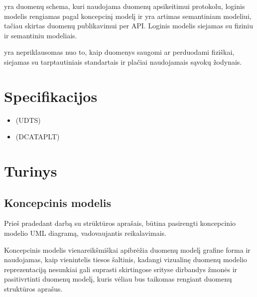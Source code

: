 \documentclass[letterpaper,10pt,lithuanian]{sphinxmanual}
\begin{document}
\sphinxAtStartPar
{} yra duomenų schema, kuri naudojama duomenų apsikeitimui
 protokolu, loginis modelis rengiamas pagal koncepcinį modelį ir yra
artimas semantiniam modeliui, tačiau skirtas duomenų publikavimui per API.
Loginis modelis siejamas su fiziniu ir semantiniu modeliais.

\sphinxAtStartPar
{} yra nepriklausomas nuo to, kaip duomenys saugomi ar
perduodami fiziškai, siejamas su tarptautiniais standartais ir plačiai
naudojamais sąvokų žodynais.


\chapter{Specifikacijos}
\label{\detokenize{index:specifikacijos}}\begin{itemize}
\item {} 
\sphinxAtStartPar
{} (UDTS)

\item {} 
\sphinxAtStartPar
{} (DCAT\sphinxhyphen{}AP\sphinxhyphen{}LT)

\end{itemize}


\chapter{Turinys}
\label{\detokenize{index:turinys}}
\sphinxstepscope


\section{Koncepcinis modelis}
\label{\detokenize{modelis:koncepcinis-modelis}}\label{\detokenize{modelis::doc}}
\sphinxAtStartPar
Prieš pradedant darbą su strūktūros aprašais, būtina pasirengti koncepcinio
modelio UML diagramą, vadovaujantis 
reikalavimais.

\sphinxAtStartPar
Koncepcinis modelis vienareikšmiškai apibrėžia duomenų modelį grafine forma ir
naudojamas, kaip vienintelis tiesos šaltinis, kadangi vizualinę duomenų modelio
reprezentaciją nesunkiai gali suprasti skirtingose srityse dirbandys žmonės ir
pasitivrtinti duomenų modelį, kuris vėliau bus taikomas rengiant duomenų
struktūros aprašus.
\end{document}
